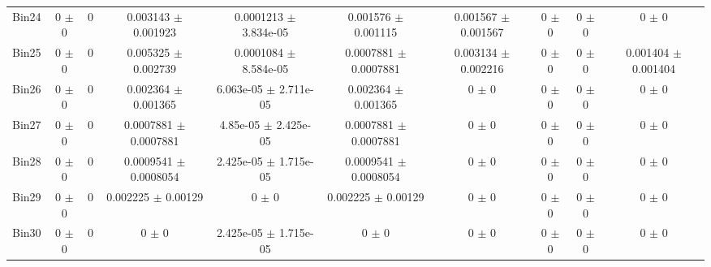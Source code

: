 \begin{tabular}{@{\extracolsep{4pt}}lccccccccc@{}}
     Bin24 & 0 $\pm$ 0 & 0 & 0.003143 $\pm$ 0.001923 & 0.0001213 $\pm$ 3.834e-05 & 0.001576 $\pm$ 0.001115 & 0.001567 $\pm$ 0.001567 & 0 $\pm$ 0 & 0 $\pm$ 0 & 0 $\pm$ 0 \\ 
     Bin25 & 0 $\pm$ 0 & 0 & 0.005325 $\pm$ 0.002739 & 0.0001084 $\pm$ 8.584e-05 & 0.0007881 $\pm$ 0.0007881 & 0.003134 $\pm$ 0.002216 & 0 $\pm$ 0 & 0 $\pm$ 0 & 0.001404 $\pm$ 0.001404 \\ 
     Bin26 & 0 $\pm$ 0 & 0 & 0.002364 $\pm$ 0.001365 & 6.063e-05 $\pm$ 2.711e-05 & 0.002364 $\pm$ 0.001365 & 0 $\pm$ 0 & 0 $\pm$ 0 & 0 $\pm$ 0 & 0 $\pm$ 0 \\ 
     Bin27 & 0 $\pm$ 0 & 0 & 0.0007881 $\pm$ 0.0007881 & 4.85e-05 $\pm$ 2.425e-05 & 0.0007881 $\pm$ 0.0007881 & 0 $\pm$ 0 & 0 $\pm$ 0 & 0 $\pm$ 0 & 0 $\pm$ 0 \\ 
     Bin28 & 0 $\pm$ 0 & 0 & 0.0009541 $\pm$ 0.0008054 & 2.425e-05 $\pm$ 1.715e-05 & 0.0009541 $\pm$ 0.0008054 & 0 $\pm$ 0 & 0 $\pm$ 0 & 0 $\pm$ 0 & 0 $\pm$ 0 \\ 
     Bin29 & 0 $\pm$ 0 & 0 & 0.002225 $\pm$ 0.00129 & 0 $\pm$ 0 & 0.002225 $\pm$ 0.00129 & 0 $\pm$ 0 & 0 $\pm$ 0 & 0 $\pm$ 0 & 0 $\pm$ 0 \\ 
     Bin30 & 0 $\pm$ 0 & 0 & 0 $\pm$ 0 & 2.425e-05 $\pm$ 1.715e-05 & 0 $\pm$ 0 & 0 $\pm$ 0 & 0 $\pm$ 0 & 0 $\pm$ 0 & 0 $\pm$ 0 \\ 
\hline\hline
  \end{tabular}
